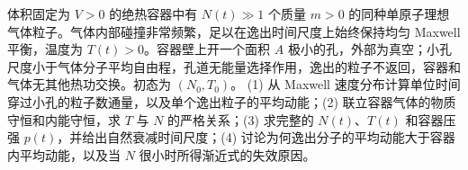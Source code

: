 体积固定为 \(V>0\) 的绝热容器中有 \(N(t)\gg1\) 个质量 \(m>0\) 的同种单原子理想气体粒子。气体内部碰撞非常频繁，足以在逸出时间尺度上始终保持均匀 Maxwell 平衡，温度为 \(T(t)>0\)。容器壁上开一个面积 \(A\) 极小的孔，外部为真空；小孔尺度小于气体分子平均自由程，孔道无能量选择作用，逸出的粒子不返回，容器和气体无其他热功交换。初态为 \((N_0,T_0)\)。
(1) 从 Maxwell 速度分布计算单位时间穿过小孔的粒子数通量，以及单个逸出粒子的平均动能；(2) 联立容器气体的物质守恒和内能守恒，求 \(T\) 与 \(N\) 的严格关系；(3) 求完整的 \(N(t)\)、\(T(t)\) 和容器压强 \(p(t)\)，并给出自然衰减时间尺度；(4) 讨论为何逸出分子的平均动能大于容器内平均动能，以及当 \(N\) 很小时所得渐近式的失效原因。
